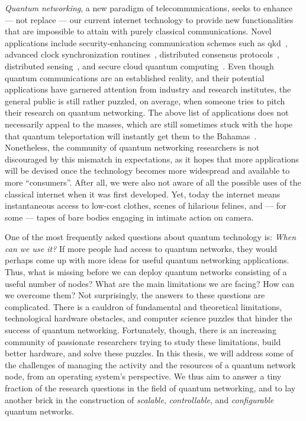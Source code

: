 \emph{Quantum networking}, a new paradigm of telecommunications, seeks to enhance --- not replace
--- our current internet technology to provide new functionalities that are impossible to attain
with purely classical communications. Novel applications include security-enhancing communication
schemes such as \acrfull{qkd}~\cite{bennett_2014_bb84, ekert_1991_e91}, advanced clock
synchronization routines~\cite{komar_2014_clocks}, distributed consensus
protocols~\cite{benor_2005_byzantine}, distributed sensing~\cite{gottesman_2012_telescope}, and
secure cloud quantum computing~\cite{broadbent_2009_ubqc, childs_2005_secure_qc}. Even though
quantum communications are an established reality, and their potential applications have garnered
attention from industry and research institutes, the general public is still rather puzzled, on
average, when someone tries to pitch their research on quantum networking. The above list of
applications does not necessarily appeal to the masses, which are still sometimes stuck with the
hope that quantum teleportation will instantly get them to the Bahamas~\cite{xkcd_teleportation}.
Nonetheless, the community of quantum networking researchers is not discouraged by this mismatch in
expectations, as it hopes that more applications will be devised once the technology becomes more
widespread and available to more ``consumers''. After all, we were also not aware of all the
possible uses of the classical internet when it was first developed. Yet, today the internet means
instantaneous access to low-cost clothes, scenes of hilarious felines, and --- for some --- tapes of
bare bodies engaging in intimate action on camera.

One of the most frequently asked questions about quantum technology is: \emph{When can we use it?}
If more people had access to quantum networks, they would perhaps come up with more ideas for useful
quantum networking applications. Thus, what is missing before we can deploy quantum networks
consisting of a useful number of nodes? What are the main limitations we are facing? How can we
overcome them? Not surprisingly, the answers to these questions are complicated. There is a cauldron
of fundamental and theoretical limitations, technological hardware obstacles, and computer science
puzzles that hinder the success of quantum networking. Fortunately, though, there is an increasing
community of passionate researchers trying to study these limitations, build better hardware, and
solve these puzzles. In this thesis, we will address some of the challenges of managing the activity
and the resources of a quantum network node, from an operating system's perspective. We thus aim to
answer a tiny fraction of the research questions in the field of quantum networking, and to lay
another brick in the construction of \emph{scalable}, \emph{controllable}, and \emph{configurable}
quantum networks.

